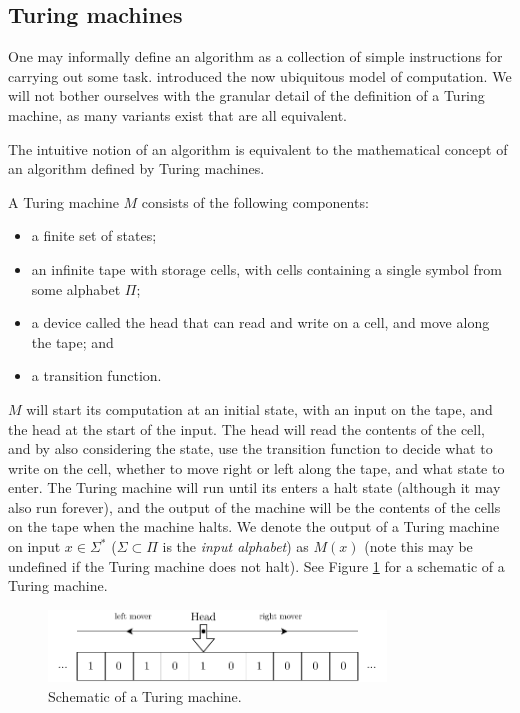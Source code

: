 \subsection{Turing machines}

One may informally define an algorithm as a collection of simple instructions for carrying out some task. \textcite{turingComputableNumbersApplication1936} introduced the now ubiquitous model of computation. We will not bother ourselves with the granular detail of the definition of a Turing machine, as many variants exist that are all equivalent. 

\begin{theorem} \label{the:church-turing}
    The intuitive notion of an algorithm is equivalent to the mathematical concept of an algorithm defined by Turing machines.
\end{theorem}
A Turing machine $M$ consists of the following components:
\begin{itemize}
    \item a finite set of states;
    \item an infinite tape with storage cells, with cells containing a single symbol from some alphabet $\Pi$;
    \item a device called the head that can read and write on a cell, and move along the tape; and 
    \item a transition function.
\end{itemize}
$M$ will start its computation at an initial state, with an input on the tape, and the head at the start of the input. The head will read the contents of the cell, and by also considering the state, use the transition function to decide what to write on the cell, whether to move right or left along the tape, and what state to enter. The Turing machine will run until its enters a halt state (although it may also run forever), and the output of the machine will be the contents of the cells on the tape when the machine halts. We denote the output of a Turing machine on input $x \in \Sigma^*$ ($\Sigma \subset \Pi$ is the \emph{input alphabet}) as $M(x)$ (note this may be undefined if the Turing machine does not halt). See Figure \ref{fig:turing-machine} for a schematic of a Turing machine.

\begin{figure}
    \centering
    \includegraphics[width=0.8\textwidth]{content/3-complexity/images/turing-machine}
    \caption{Schematic of a Turing machine.}
    \label{fig:turing-machine}
\end{figure}

